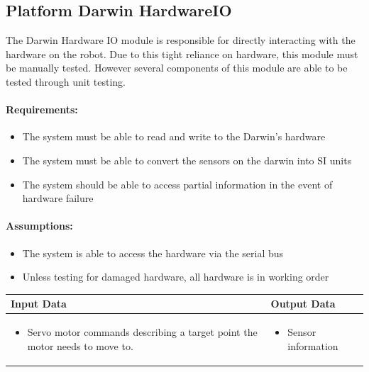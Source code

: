 \documentclass[english,12pt]{scrartcl}
\begin{document}
	\subsection{Platform Darwin HardwareIO}
		The Darwin Hardware IO module is responsible for directly interacting with the hardware on the robot.
		Due to this tight reliance on hardware, this module must be manually tested.
		However several components of this module are able to be tested through unit testing.

		\paragraph{Requirements:}
		\begin{itemize}
			\item The system must be able to read and write to the Darwin's hardware
			\item The system must be able to convert the sensors on the darwin into SI units
			\item The system should be able to access partial information in the event of hardware failure
		\end{itemize}
		
		\paragraph{Assumptions:}
		\begin{itemize}
			\item The system is able to access the hardware via the serial bus
			\item Unless testing for damaged hardware, all hardware is in working order
		\end{itemize}
		
		\begin{tabular}{p{7cm}|p{7cm}}
			\textbf{Input Data} & \textbf{Output Data} \\ \hline
			\begin{itemize}
				\item Servo motor commands describing a target point the motor needs to move to.
			\end{itemize}
			&
			\begin{itemize}
				\item Sensor information
			\end{itemize}
		\end{tabular}
\end{document}
